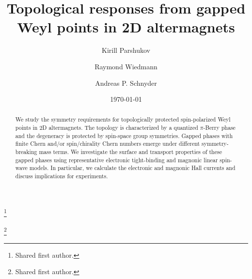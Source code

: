 \documentclass[aps,prb,twocolumn,amsmath,amssymb,floatfix]{revtex4-2}
\begin{document}
 

\title{Topological responses from gapped Weyl points in 2D altermagnets}

\date{\today}

 

\author{Kirill Parshukov}
\thanks{Shared first author.}


\author{Raymond Wiedmann}
\thanks{Shared first author.}

\author{Andreas P. Schnyder}

 

\begin{abstract}

We study the symmetry requirements for topologically protected spin-polarized Weyl points in 2D altermagnets. The topology is characterized by a quantized $\pi$-Berry phase and the degeneracy is protected by spin-space group symmetries. Gapped phases with finite Chern and/or spin/chirality Chern numbers emerge under different symmetry-breaking mass terms. We investigate the surface and transport properties of these gapped phases using representative electronic tight-binding and magnonic linear spin-wave models. 
In particular, we calculate the electronic and magnonic Hall currents and discuss implications for experiments.
\end{abstract}
\end{document}
